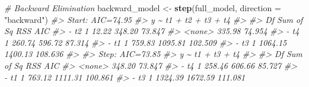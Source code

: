 \documentclass[
]{article}
\newenvironment{Shaded}{\begin{snugshade}}{\end{snugshade}}
\newcommand{\AttributeTok}[1]{\textcolor[rgb]{0.13,0.29,0.53}{#1}}
\newcommand{\CommentTok}[1]{\textcolor[rgb]{0.56,0.35,0.01}{\textit{#1}}}
\newcommand{\FunctionTok}[1]{\textcolor[rgb]{0.13,0.29,0.53}{\textbf{#1}}}
\newcommand{\NormalTok}[1]{#1}
\newcommand{\OtherTok}[1]{\textcolor[rgb]{0.56,0.35,0.01}{#1}}
\newcommand{\StringTok}[1]{\textcolor[rgb]{0.31,0.60,0.02}{#1}}
\begin{document}
\begin{Shaded}
\begin{Highlighting}[]
\CommentTok{\# Backward Elimination}
\NormalTok{backward\_model }\OtherTok{\textless{}{-}} \FunctionTok{step}\NormalTok{(full\_model, }\AttributeTok{direction =} \StringTok{"backward"}\NormalTok{)}
\CommentTok{\#\textgreater{} Start:  AIC=74.95}
\CommentTok{\#\textgreater{} y \textasciitilde{} t1 + t2 + t3 + t4}
\CommentTok{\#\textgreater{} }
\CommentTok{\#\textgreater{}        Df Sum of Sq     RSS     AIC}
\CommentTok{\#\textgreater{} {-} t2    1     12.22  348.20  73.847}
\CommentTok{\#\textgreater{} \textless{}none\textgreater{}               335.98  74.954}
\CommentTok{\#\textgreater{} {-} t4    1    260.74  596.72  87.314}
\CommentTok{\#\textgreater{} {-} t1    1    759.83 1095.81 102.509}
\CommentTok{\#\textgreater{} {-} t3    1   1064.15 1400.13 108.636}
\CommentTok{\#\textgreater{} }
\CommentTok{\#\textgreater{} Step:  AIC=73.85}
\CommentTok{\#\textgreater{} y \textasciitilde{} t1 + t3 + t4}
\CommentTok{\#\textgreater{} }
\CommentTok{\#\textgreater{}        Df Sum of Sq     RSS     AIC}
\CommentTok{\#\textgreater{} \textless{}none\textgreater{}               348.20  73.847}
\CommentTok{\#\textgreater{} {-} t4    1    258.46  606.66  85.727}
\CommentTok{\#\textgreater{} {-} t1    1    763.12 1111.31 100.861}
\CommentTok{\#\textgreater{} {-} t3    1   1324.39 1672.59 111.081}


\end{Highlighting}
\end{Shaded}
\end{document}

